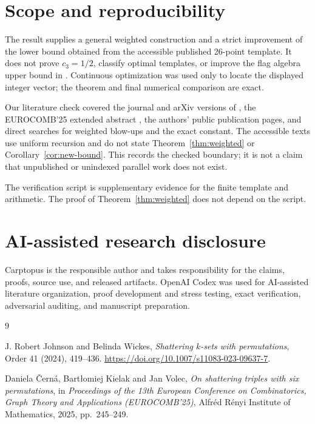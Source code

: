 \documentclass[11pt]{article}
\begin{document}
\section{Scope and reproducibility}

The result supplies a general weighted construction and a strict improvement
of the lower bound obtained from the accessible published 26-point template.
It does not prove $c_3=1/2$, classify optimal templates, or improve the flag
algebra upper bound in \cite{cerna-kielak-volec}.  Continuous optimization was
used only to locate the displayed integer vector; the theorem and final
numerical comparison are exact.

Our literature check covered the journal and arXiv versions of
\cite{johnson-wickes}, the EUROCOMB'25 extended abstract
\cite{cerna-kielak-volec}, the authors' public publication pages, and direct
searches for weighted blow-ups and the exact constant.  The accessible texts
use uniform recursion and do not state Theorem~\ref{thm:weighted} or
Corollary~\ref{cor:new-bound}.  This records the checked boundary; it is not a
claim that unpublished or unindexed parallel work does not exist.

The verification script is supplementary evidence for the finite template
and arithmetic.  The proof of Theorem~\ref{thm:weighted} does not depend on
the script.

\section*{AI-assisted research disclosure}

Carptopus is the responsible author and takes responsibility for the claims,
proofs, source use, and released artifacts.  OpenAI Codex was used for
AI-assisted literature organization, proof development and stress testing,
exact verification, adversarial auditing, and manuscript preparation.

\begin{thebibliography}{9}

J. Robert Johnson and Belinda Wickes,
\emph{Shattering $k$-sets with permutations},
Order 41 (2024), 419--436.
\url{https://doi.org/10.1007/s11083-023-09637-7}.

Daniela \v{C}ern\'a, Bart{\l}omiej Kielak and Jan Volec,
\emph{On shattering triples with six permutations},
in \emph{Proceedings of the 13th European Conference on Combinatorics,
Graph Theory and Applications (EUROCOMB'25)},
Alfr\'ed R\'enyi Institute of Mathematics, 2025, pp.~245--249.

\end{thebibliography}
\end{document}
